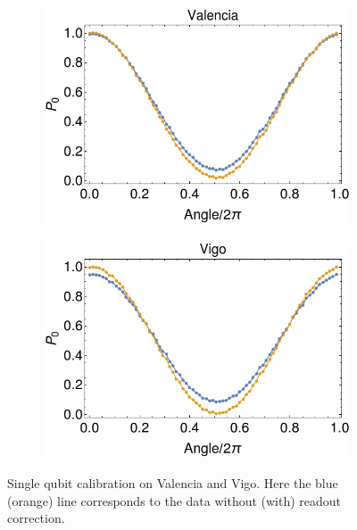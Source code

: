 \begin{figure}[H]
    \centering
    \begin{subfigure}{.5\textwidth}
      \centering
      \includegraphics[width=\textwidth]{Figures/Calibrations/calibration_valencia.png}
    \end{subfigure}%
    \begin{subfigure}{.5\textwidth}
      \centering
      \includegraphics[width=\textwidth]{Figures/Calibrations/calibration_vigo.png}
    \end{subfigure}
    \caption{Single qubit calibration on Valencia and Vigo. Here the blue (orange) line corresponds to the data without (with) readout correction.}
    \label{fig:pc_yorktown_sphere}
\end{figure}

